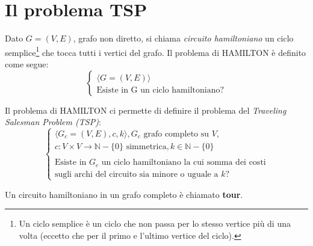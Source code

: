 \section{Il problema TSP}
\label{sez:tsp}
Dato $G=(V,E)$, grafo non diretto, si chiama \textit{circuito hamiltoniano} un ciclo semplice\footnote{Un ciclo semplice è un ciclo che non passa per lo stesso vertice più di una volta (eccetto che per il primo e l'ultimo vertice del ciclo).} che tocca tutti i vertici del grafo. Il problema di HAMILTON è definito come segue:
\[
\begin{cases}
\langle G=(V,E)\rangle  \\
\mbox{Esiste in G un ciclo hamiltoniano?}
\end{cases}
\]

Il problema di HAMILTON ci permette di definire il problema del \textit{Traveling Salesman Problem (TSP)}:
\[
\begin{cases}
\langle G_c=(V,E),c,k\rangle ,G_c \mbox{ grafo completo su $V$,} \\
c : V \times V \rightarrow \mathbb{N}-\{0\} \mbox{ simmetrica}, k \in \mathbb{N}-\{0\} \\
\\
\mbox{Esiste in $G_c$ un ciclo hamiltoniano la cui somma dei costi} \\
\mbox{sugli archi del circuito sia minore o uguale a $k$?}
\end{cases}
\]

\begin{definizione}
Un circuito hamiltoniano in un grafo completo è chiamato \textbf{tour}.
\end{definizione}


